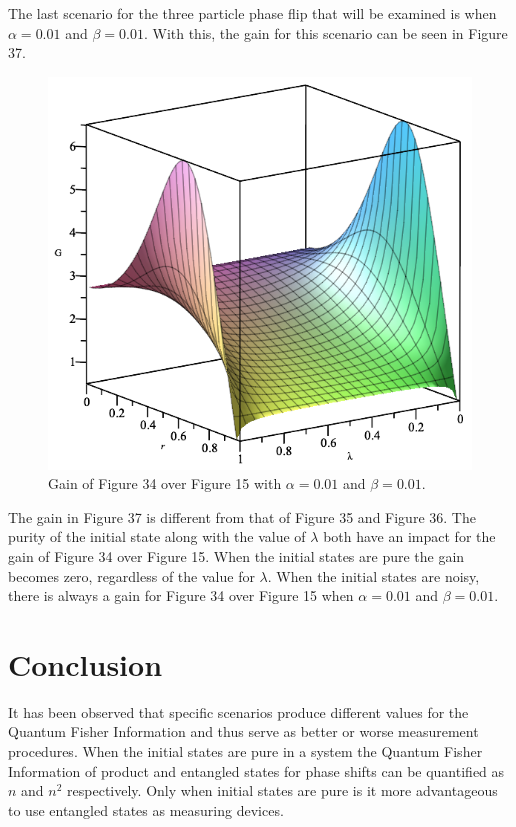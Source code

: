 \documentclass[twocolumn]{article}
\begin{document}
The last scenario for the three particle phase flip that will be examined is when $\alpha=0.01$ and $\beta=0.01$. With this, the gain for this scenario can be seen in Figure 37.
\begin{figure}[h]
\begin{center}
\includegraphics[width=0.65\linewidth]{Phase-Flip-Triple-Channel-Alpha=001-Beta=001-Gain-Graph.png}
\caption{Gain of Figure 34 over Figure 15 with $\alpha=0.01$ and $\beta=0.01$.}
\end{center}
\end{figure}
\newline
The gain in Figure 37 is different from that of Figure 35 and Figure 36. The purity of the initial state along with the value of $\lambda$ both have an impact for the gain of Figure 34 over Figure 15. When the initial states are pure the gain becomes zero, regardless of the value for $\lambda$. When the initial states are noisy, there is always a gain for Figure 34 over Figure 15 when $\alpha=0.01$ and $\beta=0.01$.
\section*{Conclusion}
It has been observed that specific scenarios produce different values for the Quantum Fisher Information and thus serve as better or worse measurement procedures. When the initial states are pure in a system the Quantum Fisher Information of product and entangled states for phase shifts can be quantified as $n$ and $n^2$ respectively. Only when initial states are pure is it more advantageous to use entangled states as measuring devices.
\end{document}
